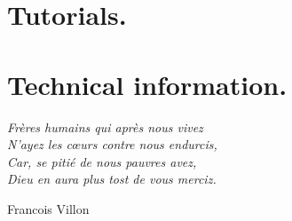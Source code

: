\documentclass{scrartcl}
\begin{document}


\newpage


\newpage
\tableofcontents

\newpage


\newpage
\part{Tutorials.}

\newpage


\newpage


\newpage


\newpage


\newpage



\newpage
\part{Technical information.}
\vfill
\epigraph{
\textit{Frères humains qui après nous vivez \\ 
N'ayez les cœurs contre nous endurcis, \\
Car, se pitié de nous pauvres avez, \\ 
Dieu en aura plus tost de vous merciz.}
}{Francois Villon}

\newpage






\newpage

\clearpage 

\end{document}
